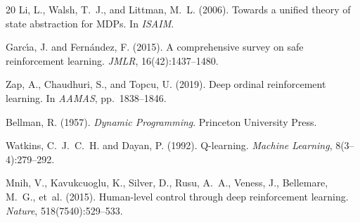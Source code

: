 \documentclass[9pt,a4paper]{article}
\theoremstyle{plain}
\theoremstyle{definition}
\theoremstyle{remark}
\begin{document}
\begin{thebibliography}{20}
Li, L., Walsh, T.~J., and Littman, M.~L. (2006).
Towards a unified theory of state abstraction for MDPs.
In \textit{ISAIM}.

Garc{\'\i}a, J. and Fern{\'a}ndez, F. (2015).
A comprehensive survey on safe reinforcement learning.
\textit{JMLR}, 16(42):1437--1480.

Zap, A., Chaudhuri, S., and Topcu, U. (2019).
Deep ordinal reinforcement learning.
In \textit{AAMAS}, pp.~1838--1846.

Bellman, R. (1957).
\textit{Dynamic Programming}.
Princeton University Press.

Watkins, C.~J.~C.~H. and Dayan, P. (1992).
Q-learning.
\textit{Machine Learning}, 8(3--4):279--292.

Mnih, V., Kavukcuoglu, K., Silver, D., Rusu, A.~A., Veness, J., Bellemare, M.~G., et~al. (2015).
Human-level control through deep reinforcement learning.
\textit{Nature}, 518(7540):529--533.

\end{thebibliography}
\end{document}
